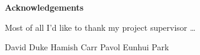 \begin{center}
    {\LARGE\bf Acknowledgements}
\end{center}

Most of all I'd like to thank my project supervisor \dots

David Duke
Hamish Carr
Pavol 
Eunhui Park



